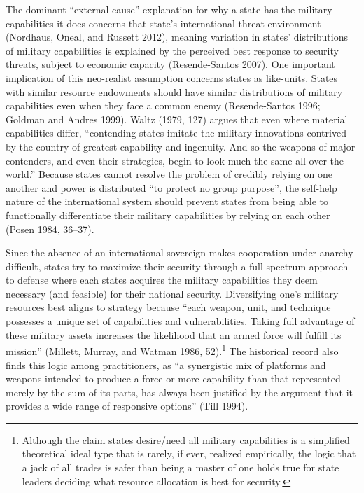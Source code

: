 \documentclass[
  12,
  letterpaper,
  DIV=11,
  numbers=noendperiod]{scrartcl}
\begin{document}
The dominant ``external cause'' explanation for why a state has the
military capabilities it does concerns that state's international threat
environment (Nordhaus, Oneal, and Russett 2012), meaning variation in
states' distributions of military capabilities is explained by the
perceived best response to security threats, subject to economic
capacity (Resende-Santos 2007). One important implication of this
neo-realist assumption concerns states as like-units. States with
similar resource endowments should have similar distributions of
military capabilities even when they face a common enemy (Resende-Santos
1996; Goldman and Andres 1999). Waltz (1979, 127) argues that even where
material capabilities differ, ``contending states imitate the military
innovations contrived by the country of greatest capability and
ingenuity. And so the weapons of major contenders, and even their
strategies, begin to look much the same all over the world.'' Because
states cannot resolve the problem of credibly relying on one another and
power is distributed ``to protect no group purpose'', the self-help
nature of the international system should prevent states from being able
to functionally differentiate their military capabilities by relying on
each other (Posen 1984, 36--37).

Since the absence of an international sovereign makes cooperation under
anarchy difficult, states try to maximize their security through a
full-spectrum approach to defense where each states acquires the
military capabilities they deem necessary (and feasible) for their
national security. Diversifying one's military resources best aligns to
strategy because ``each weapon, unit, and technique possesses a unique
set of capabilities and vulnerabilities. Taking full advantage of these
military assets increases the likelihood that an armed force will
fulfill its mission'' (Millett, Murray, and Watman 1986, 52).\footnote{Although
  the claim states desire/need all military capabilities is a simplified
  theoretical ideal type that is rarely, if ever, realized empirically,
  the logic that a jack of all trades is safer than being a master of
  one holds true for state leaders deciding what resource allocation is
  best for security.} The historical record also finds this logic among
practitioners, as ``a synergistic mix of platforms and weapons intended
to produce a force or more capability than that represented merely by
the sum of its parts, has always been justified by the argument that it
provides a wide range of responsive options'' (Till 1994).
\end{document}
